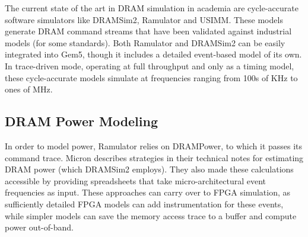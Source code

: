 The current state of the art in DRAM simulation in academia are cycle-accurate
software simulators like DRAMSim2\cite{dramsim}, Ramulator\cite{ramulator} and
USIMM\cite{usimm}. These models generate DRAM command streams that have been
validated against industrial models (for some standards). Both Ramulator and
DRAMSim2 can be easily integrated into Gem5\cite{gem5}, though it includes a
detailed event-based model of its own\cite{gem5event}. In trace-driven mode,
operating at full throughput and only as a timing model, these cycle-accurate
models simulate at frequencies ranging from 100s of KHz to ones of
MHz\cite{ramulator}.

\subsection{DRAM Power Modeling}

In order to model power, Ramulator relies on DRAMPower\cite{drampower}, to
which it passes its command trace. Micron describes strategies in their
technical notes for estimating DRAM power\cite{micronpower} (which DRAMSim2
employs). They also made these calculations accessible by providing
spreadsheets that take micro-architectural event frequencies as input. These
approaches can carry over to FPGA simulation, as sufficiently detailed FPGA
models can add instrumentation for these events, while simpler models can save
the memory access trace to a buffer and compute power
out-of-band\cite{strober}.

